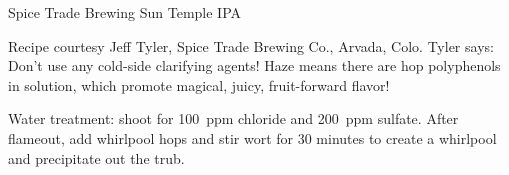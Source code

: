 \begin{recipie}{Spice Trade Brewing Sun Temple IPA}

\begin{aboutblock}
Recipe courtesy Jeff Tyler, Spice Trade Brewing Co., Arvada, Colo. Tyler says:
Don't use any cold-side clarifying agents! Haze means there are hop polyphenols in
solution, which promote magical, juicy, fruit-forward flavor!
\end{aboutblock}


\begin{methodandtiming}
 
\begin{mashsteps}
\end{mashsteps}

\begin{fermentationsteps}
\end{fermentationsteps}

\begin{directions}
Water treatment: shoot for 100~ppm chloride and 200~ppm sulfate. After flameout,
add whirlpool hops and stir wort for 30 minutes to create a whirlpool and
precipitate out the trub.
\end{directions}

\end{methodandtiming}

\pagebreak

\begin{ingredientsblock}

\begin{malts}
\end{malts}

\begin{hops}
\end{hops}


\end{ingredientsblock}
\end{recipie}
